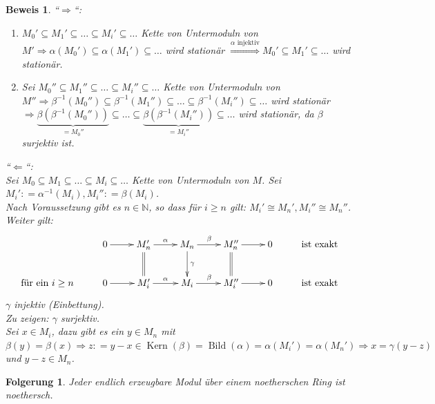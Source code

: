\documentclass[a4paper,12pt]{scrbook}
\theoremstyle{break}
\newtheorem{Folg}[Def]{Folgerung}
\theoremstyle{nonumberbreak}
\newtheorem{Bew}{Beweis}
\theoremstyle{nonumberplain}
\newcommand{\defeqr}[0]{\mathrel{\mathop:}=}
\DeclareMathOperator{\Kern}{Kern}
\DeclareMathOperator{\Bild}{Bild}
\begin{document}
\begin{Bew} 
  ``$\Rightarrow$``:
  \begin{enumerate}
    \item[(i)] $M_0' \subseteq M_1' \subseteq \dots  \subseteq M_i' \subseteq
               \dots$ Kette von Untermoduln von $M' \Rightarrow \alpha(M_0')
               \subseteq \alpha(M_1') \subseteq \dots$ wird stationär
               $\overset{\alpha \text{ injektiv}}{\Longrightarrow} M_0'
               \subseteq M_1' \subseteq \dots$ wird stationär.
    \item[(ii)] Sei $M_0'' \subseteq M_1'' \subseteq \dots \subseteq M_i''
                \subseteq \dots$ Kette von Untermoduln von $M'' \Rightarrow
                \beta^{-1}(M_0'') \subseteq \beta^{-1}(M_1'') \subseteq \dots
                \subseteq \beta^{-1}(M_i'') \subseteq \dots$ wird stationär
                $\Rightarrow \underset{= M_0''
                }{\underbrace{\beta(\beta^{-1}(M_0''))}} \subseteq \dots \subseteq
                \underset{=M_i''}{\underbrace{\beta(\beta^{-1}(M_i''))}}
                \subseteq \dots$ wird stationär, da $\beta$ surjektiv ist.
  \end{enumerate}
  ``$\Leftarrow$``:\\
  Sei $M_0 \subseteq M_1 \subseteq \dots \subseteq M_i \subseteq \dots$
  Kette von Untermoduln von $M$. Sei $M_i' \defeqr \alpha^{-1}(M_i), M_i''
  \defeqr \beta(M_i)$.\\
  Nach Voraussetzung gibt es $n \in \mathbb{N}$, so dass für $i \ge n$ gilt:
  $M_i' \cong M_n', M_i'' \cong M_n''$. Weiter gilt:
  \[
  \begin{xy}
    \xymatrix{
      & 0 \ar@{->}[r] & M_n' \ar@{=}[d] \ar@{->}[r]^{\alpha} & M_n
      \ar@{->}[d]^{\gamma}
      \ar@{->}[r]^{\beta} & M_n''  \ar@{=}[d] \ar@{->}[r] & 0 & \mbox{ist exakt}\\
      \mbox{für ein } i \ge n& 0  \ar@{->}[r] & M_i' \ar@{->}[r]^{\alpha} & M_i
      \ar@{->}[r]^{\beta} & M_i'' \ar@{->}[r] & 0 &
      \mbox{ist exakt}}
  \end{xy}\]
  $\gamma$ injektiv (Einbettung).\\
  Zu zeigen: $\gamma$ surjektiv.\\
  Sei $x \in M_i$, dazu gibt es ein $y \in M_n$ mit $\beta(y) = \beta(x)
  \Rightarrow z \defeqr y-x \in \Kern(\beta) = \Bild(\alpha)
  = \alpha(M_i') = \alpha(M_n') \Rightarrow x = \gamma(y - z)$ und $y-z \in M_n$.
\end{Bew}

\begin{Folg}
\label{2.3}
  Jeder endlich erzeugbare Modul über einem noetherschen Ring ist noethersch.
\end{Folg}
\end{document}
